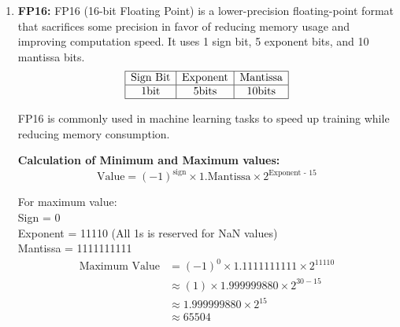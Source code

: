 \documentclass{ioereport}
\begin{document}
\begin{enumerate}[label=\textbf{\roman*.}]
\item \textbf{FP16:}
    FP16 (16-bit Floating Point) is a lower-precision floating-point format that sacrifices some precision in favor of reducing memory usage and improving computation speed. It uses 1 sign bit, 5 exponent bits, and 10 mantissa bits.
    \[
    \begin{array}{|c|c|c|}
        \hline
        \text{Sign Bit} & \text{Exponent} & \text{Mantissa} \\
        \hline
        1 \text{bit} & 5 \text{bits} & 10 \text{bits} \\
        \hline
    \end{array}
    \]
    
    FP16 is commonly used in machine learning tasks to speed up training while reducing memory consumption.

    \textbf{Calculation of Minimum and Maximum values:}
    \[
    \text{Value} = (-1)^{\text{sign}} \times 1.\text{Mantissa} \times 2^{\text{Exponent - 15}}
    \]

    For maximum value:\\
    Sign = 0 \\
    Exponent = 11110 (All 1s is reserved for NaN values) \\
    Mantissa = 1111111111 
    \[
        \begin{aligned}
            \text{Maximum Value} &= (-1)^{0} \times 1.1111111111 \times 2^{11110} \\
            & \approx (1) \times 1.999999880 \times 2^{30 - 15} \\
            & \approx 1.999999880 \times 2^{15} \\
            & \approx 65504
        \end{aligned}
    \]


\end{enumerate}
\end{document}
